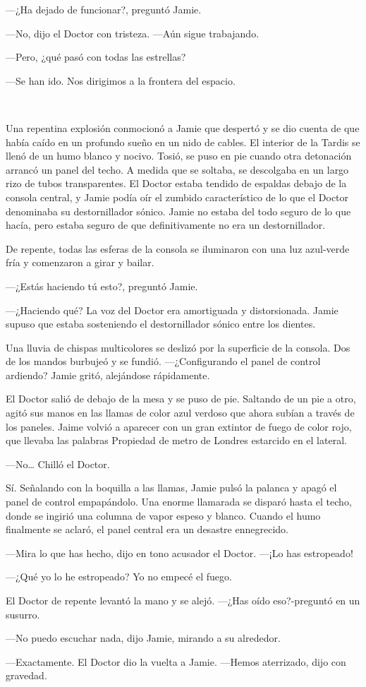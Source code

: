 ---¿Ha dejado de funcionar?, preguntó Jamie.

---No, dijo el Doctor con tristeza. ---Aún sigue trabajando.

---Pero, ¿qué pasó con todas las estrellas?

---Se han ido. Nos dirigimos a la frontera del espacio.

~

Una repentina explosión conmocionó a Jamie  que despertó y se dio cuenta
de que había caído en un profundo sueño en un nido de cables. El
interior de la Tardis se llenó de un humo blanco y nocivo. Tosió, se
puso en pie cuando otra detonación arrancó un panel del techo. A medida
que se soltaba, se descolgaba en un largo rizo de tubos transparentes.
El Doctor estaba tendido de espaldas debajo de la consola central, y
Jamie podía oír el zumbido característico de lo que el Doctor denominaba
su destornillador sónico. Jamie no estaba del todo seguro de lo que
hacía, pero estaba seguro de que definitivamente no era un
destornillador.

De repente, todas las esferas de la consola se iluminaron con una luz
azul-verde fría y comenzaron a girar y bailar.

---¿Estás haciendo tú esto?, preguntó Jamie.

---¿Haciendo qué? La voz del Doctor era amortiguada y distorsionada.
Jamie supuso que estaba sosteniendo el destornillador sónico entre los
dientes.

Una lluvia de chispas multicolores se deslizó por la superficie de la
consola. Dos de los mandos burbujeó y se fundió. ---¿Configurando el
panel de control ardiendo? Jamie gritó, alejándose rápidamente.

El Doctor salió de debajo de la mesa y se puso de pie. Saltando de un
pie a otro, agitó sus manos en las llamas de color azul verdoso que
ahora subían a través de los paneles. Jaime volvió a aparecer con un
gran extintor de fuego de color rojo, que llevaba las palabras Propiedad
de metro de Londres estarcido en el lateral.

---No\ldots{} Chilló el Doctor.

Sí. Señalando con la boquilla a las llamas, Jamie pulsó la palanca y
apagó el panel de control empapándolo. Una enorme llamarada se disparó
hasta el techo, donde se ingirió una columna de vapor espeso y blanco.
Cuando el humo finalmente se aclaró, el panel central era un desastre
ennegrecido.

---Mira lo que has hecho, dijo en tono acusador el Doctor. ---¡Lo has
estropeado!

---¿Qué yo lo he estropeado? Yo no empecé el fuego.

El Doctor de repente levantó la mano y se alejó. ---¿Has oído
eso?-preguntó en un susurro.

---No puedo escuchar nada, dijo Jamie, mirando a su alrededor.

---Exactamente. El Doctor dio la vuelta a Jamie. ---Hemos aterrizado,
dijo con gravedad.
